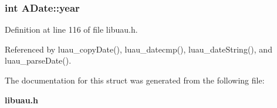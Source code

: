 \subsubsection{\setlength{\rightskip}{0pt plus 5cm}int {\bf ADate::year}}\label{structADate_o2}




Definition at line 116 of file libuau.h.

Referenced by luau\_\-copy\-Date(), luau\_\-datecmp(), luau\_\-date\-String(), and luau\_\-parse\-Date().

The documentation for this struct was generated from the following file:\begin{CompactItemize}
\item 
{\bf libuau.h}\end{CompactItemize}

